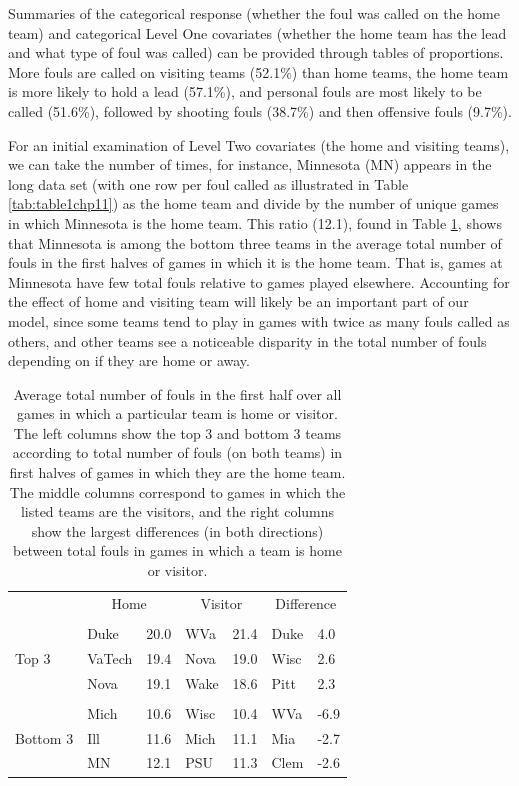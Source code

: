 \documentclass[
]{krantz}
\begin{document}
Summaries of the categorical response (whether the foul was called on the home team) and categorical Level One covariates (whether the home team has the lead and what type of foul was called) can be provided through tables of proportions. More fouls are called on visiting teams (52.1\%) than home teams, the home team is more likely to hold a lead (57.1\%), and personal fouls are most likely to be called (51.6\%), followed by shooting fouls (38.7\%) and then offensive fouls (9.7\%).

For an initial examination of Level Two covariates (the home and visiting teams), we can take the number of times, for instance, Minnesota (MN) appears in the long data set (with one row per foul called as illustrated in Table \ref{tab:table1chp11}) as the home team and divide by the number of unique games in which Minnesota is the home team. This ratio (12.1), found in Table \ref{tab:table2chp11}, shows that Minnesota is among the bottom three teams in the average total number of fouls in the first halves of games in which it is the home team. That is, games at Minnesota have few total fouls relative to games played elsewhere. Accounting for the effect of home and visiting team will likely be an important part of our model, since some teams tend to play in games with twice as many fouls called as others, and other teams see a noticeable disparity in the total number of fouls depending on if they are home or away.

\begin{table}[t]

\caption{\label{tab:table2chp11} Average total number of fouls in the first half over all games in which a particular team is home or visitor.  The left columns show the top 3 and bottom 3 teams according to total number of fouls (on both teams) in first halves of games in which they are the home team.  The middle columns correspond to games in which the listed teams are the visitors, and the right columns show the largest differences (in both directions) between total fouls in games in which a team is home or visitor.}
\centering
\begin{tabular}{lllllll}
\toprule
\multicolumn{1}{c}{ } & \multicolumn{2}{c}{Home} & \multicolumn{2}{c}{Visitor} & \multicolumn{2}{c}{Difference} \\
\cmidrule(l{2pt}r{2pt}){2-3} \cmidrule(l{2pt}r{2pt}){4-5} \cmidrule(l{2pt}r{2pt}){6-7}
  &   &   &   &   &   &  \\
\midrule
 & Duke & 20.0 & WVa & 21.4 & Duke & 4.0\\
Top 3 & VaTech & 19.4 & Nova & 19.0 & Wisc & 2.6\\
 & Nova & 19.1 & Wake & 18.6 & Pitt & 2.3\\
 &  &  &  &  &  & \\
 & Mich & 10.6 & Wisc & 10.4 & WVa & -6.9\\
\addlinespace
Bottom 3 & Ill & 11.6 & Mich & 11.1 & Mia & -2.7\\
 & MN & 12.1 & PSU & 11.3 & Clem & -2.6\\
\bottomrule
\end{tabular}
\end{table}
\end{document}
